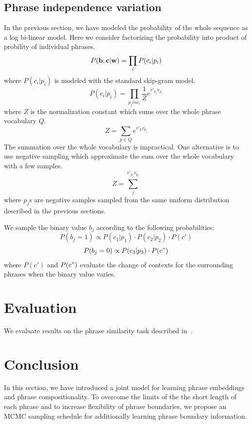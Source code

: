 \subsection{Phrase independence variation}
In the previous section, we have modeled the probability of the whole sequence as a log bi-linear model. Here we consider factorizing the probability into product of probility of individual phrases.
$$P({\bf b},{\bf c}|{\bf w}) = \prod_i P(c_i| p_i) $$
where $P(c_i| p_i)$ is modeled with the standard skip-gram model.
$$P(c_i| p_i) = \prod_{p_j in c_i} \frac{1}{Z} e^{v'_{p_j} v_{p_i}}$$
where $Z$ is the normalization constant which sums over the whole phrase vocabulary $Q$.
$$Z = \sum_{p \in Q}e^{v'_p v_{p_i}}$$
The summation over the whole vocabulary is impractical. One alternative is to use negative sampling which approximate the sum over the whole vocabulary with a few samples.
$$Z = \sum_{j} ^{v'_{p_j} v_{p_i}}$$
where $p_j$s are negative samples sampled from the same uniform distribution described in the previous sections.


We sample the binary value $b_j$ according to the following probabilities:
$$P(b_j = 1) \propto P(c_1 | p_1) \cdot P(c_2 | p_2) \cdot P(c')$$
$$P(b_j = 0) \propto P(c_3 | p_3)\cdot P(c")$$
where $P(c')$ and $P(c")$ evaluate the change of contexts for the surrounding phrases when the binary value varies.

\section{Evaluation}
We evaluate results on the phrase similarity task described in~.

\section{Conclusion}
In this section, we have introduced a joint model for learning phrase embeddings and phrase compositionality. To overcome the limits of the the short length of each phrase and to increase flexibility of 
phrase boundaries, we propose an MCMC sampling schedule for additionally learning phrase boundary information.
